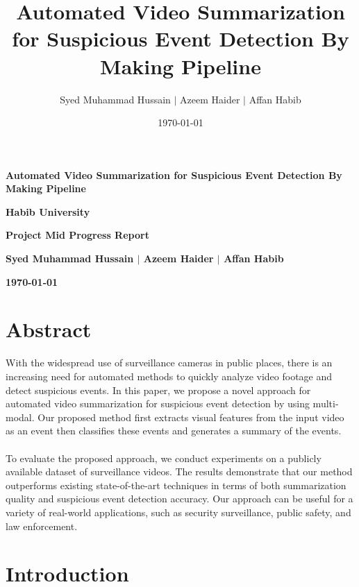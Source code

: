 \documentclass[title page]{article}
\title{Automated Video Summarization for Suspicious Event Detection By Making Pipeline}
\author{Syed Muhammad Hussain $\mid$ Azeem Haider $\mid$ Affan Habib}
\date{\today}
\newcommand{\institute}{Habib University}
\begin{document}
\begin{titlepage}
\begin{center}
\vspace*{1cm}
\Large
\textbf{Automated Video Summarization for Suspicious Event Detection By Making Pipeline}

\vspace{0.5cm}
\textbf{\institute}

\vspace{0.5cm}
\textbf{Project Mid Progress Report}

\vspace{1.5cm}
\textbf{Syed Muhammad Hussain $\mid$ Azeem Haider $\mid$ Affan Habib}

\vspace{0.5cm}
\textbf{\today} 

\vfill
\end{center}
\end{titlepage}

\tableofcontents

\newpage

\section{Abstract}

With the widespread use of surveillance cameras in public places, there is an increasing need for automated methods to quickly analyze video footage and detect suspicious events. In this paper, we propose a novel approach for automated video summarization for suspicious event detection by using multi-modal. Our proposed method first extracts visual features from the input video as an event then classifies these events and generates a summary of the events. 
\\ \\
To evaluate the proposed approach, we conduct experiments on a publicly available dataset of surveillance videos. The results demonstrate that our method outperforms existing state-of-the-art techniques in terms of both summarization quality and suspicious event detection accuracy. Our approach can be useful for a variety of real-world applications, such as security surveillance, public safety, and law enforcement.

\section{Introduction}
\end{document}
